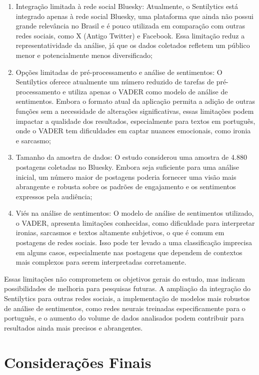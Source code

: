 \documentclass[
	12pt,				%
	oneside,			%
	a4paper,			%
	english,			%
	french,				%
	spanish,			%
	brazil				%
	]{abntex2}
\begin{document}
\begin{enumerate}
\def\labelenumi{\arabic{enumi})}
\item
  Integração limitada à rede social Bluesky: Atualmente, o Sentilytics
  está integrado apenas à rede social Bluesky, uma plataforma que ainda
  não possui grande relevância no Brasil e é pouco utilizada em
  comparação com outras redes sociais, como X (Antigo Twitter) e
  Facebook. Essa limitação reduz a representatividade da análise, já que
  os dados coletados refletem um público menor e potencialmente menos
  diversificado;
\item
  Opções limitadas de pré-processamento e análise de sentimentos: O
  Sentilytics oferece atualmente um número reduzido de tarefas de
  pré-processamento e utiliza apenas o VADER como modelo de análise de
  sentimentos. Embora o formato atual da aplicação permita a adição de
  outras funções sem a necessidade de alterações significativas, essas
  limitações podem impactar a qualidade dos resultados, especialmente
  para textos em português, onde o VADER tem dificuldades em captar
  nuances emocionais, como ironia e sarcasmo;
\item
  Tamanho da amostra de dados: O estudo considerou uma amostra de 4.880
  postagens coletadas no Bluesky. Embora seja suficiente para uma
  análise inicial, um número maior de postagens poderia fornecer uma
  visão mais abrangente e robusta sobre os padrões de engajamento e os
  sentimentos expressos pela audiência;
\item
  Viés na análise de sentimentos: O modelo de análise de sentimentos
  utilizado, o VADER, apresenta limitações conhecidas, como dificuldade
  para interpretar ironias, sarcasmos e textos altamente subjetivos, o
  que é comum em postagens de redes sociais. Isso pode ter levado a uma
  classificação imprecisa em alguns casos, especialmente nas postagens
  que dependem de contextos mais complexos para serem interpretadas
  corretamente.
\end{enumerate}

Essas limitações não comprometem os objetivos gerais do estudo, mas
indicam possibilidades de melhoria para pesquisas futuras. A ampliação
da integração do Sentilytics para outras redes sociais, a implementação
de modelos mais robustos de análise de sentimentos, como redes neurais
treinadas especificamente para o português, e o aumento do volume de
dados analisados podem contribuir para resultados ainda mais precisos e
abrangentes.

\hypertarget{considerauxe7uxf5es-finais}{%
\chapter{Considerações Finais}\label{considerauxe7uxf5es-finais}}
\end{document}
